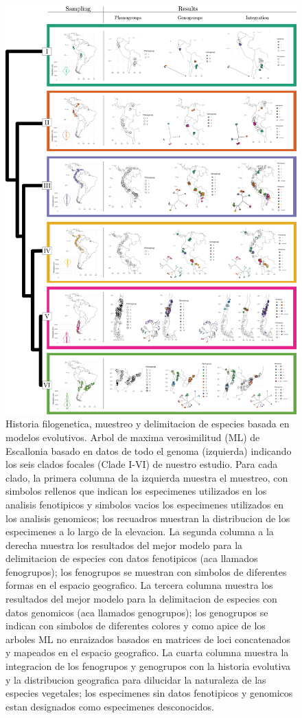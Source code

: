 \documentclass[
  11pt,
]{article}
\begin{document}
\begin{figure}

{\centering \includegraphics[width=0.7\linewidth,]{figures/Figure1} 

}

\caption{Historia filogenetica, muestreo y delimitacion de especies basada en modelos evolutivos. Arbol de maxima verosimilitud (ML) de Escallonia basado en datos de todo el genoma (izquierda) indicando los seis clados focales (Clade I-VI) de nuestro estudio. Para cada clado, la primera columna de la izquierda muestra el muestreo, con simbolos rellenos que indican los especimenes utilizados en los analisis fenotipicos y simbolos vacios los especimenes utilizados en los analisis genomicos; los recuadros muestran la distribucion de los especimenes a lo largo de la elevacion. La segunda columna a la derecha muestra los resultados del mejor modelo para la delimitacion de especies con datos fenotipicos (aca llamados fenogrupos); los fenogrupos se muestran con simbolos de diferentes formas en el espacio geografico. La tercera columna muestra los resultados del mejor modelo para la delimitacion de especies con datos genomicos (aca llamados genogrupos); los genogrupos se indican con simbolos de diferentes colores y como apice de los arboles ML no enraizados basados en matrices de loci concatenados y mapeados en el espacio geografico. La cuarta columna muestra la integracion de los fenogrupos y genogrupos con la historia evolutiva y la distribucion geografica para dilucidar la naturaleza de las especies vegetales; los especimenes sin datos fenotipicos y genomicos  estan designados como especimenes desconocidos.}\label{fig:figure1}
\end{figure}
\end{document}
